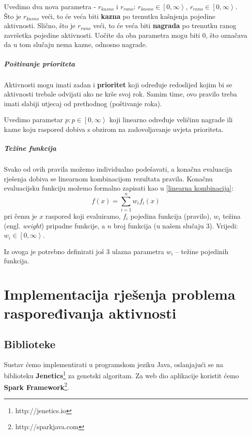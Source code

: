 \documentclass[times, utf8, zavrsni]{fer}
\begin{document}
Uvedimo dva nova parametra - $r_{kasno}$ i $r_{rano}$: $r_{kasno} \in \left[0,\infty \right>$, $r_{rano} \in \left[0,\infty \right>$. Što je $r_{kasno}$ veći, to će veća biti \textbf{kazna} po trenutku kašnjenja pojedine aktivnosti. Slično, što je $r_{rano}$ veći, to će veća biti \textbf{nagrada} po trenutku ranog završetka pojedine aktivnosti. Uočite da oba parametra mogu biti $0$, što označava da u tom slučaju nema kazne, odnosno nagrade.

\paragraph{Poštivanje prioriteta} Aktivnosti mogu imati zadan i \textbf{prioritet} koji određuje redoslijed kojim bi se aktivnosti trebale odvijati ako ne krše svoj rok. Samim time, ovo pravilo treba imati slabiji utjecaj od prethodnog (poštivanje roka).

Uvedimo parametar $p : p \in \left[0,\infty\right>$ koji linearno određuje veličinu nagrade ili kazne koju raspored dobiva s obzirom na zadovoljavanje uvjeta prioriteta.

\paragraph{Težine funkcija} Svako od ovih pravila možemo individualno podešavati, a konačna evaluacija rješenja dobiva se linearnom kombinacijom rezultata pravila. Konačnu evaluacijsku funkciju možemo formalno zapisati kao u \ref{linearna kombinacija}:
\begin{equation}\label{linearna kombinacija}
f(x) = \sum_{i=1}^{n} w_i f_i(x)
\end{equation}
pri čemu je $x$ raspored koji evaluiramo, $f_i$ pojedina funkcija (pravilo), $w_i$ težina (engl. \textit{weight}) pripadne funkcije, a $n$ broj funkcija (u našem slučaju 3). Vrijedi: $w_i \in \left[0, \infty\right>$.

Iz ovoga je potrebno definirati još 3 ulazna parametra $w_i$ -- težine pojedinih funkcija.

\chapter{Implementacija rješenja problema raspoređivanja aktivnosti}\label{implementacija}

\section{Biblioteke}
Sustav ćemo implementirati u programskom jeziku Java, oslanjajući se na biblioteku \textbf{Jenetics}\footnote{http://jenetics.io} za genetski algoritam. Za web dio aplikacije koristit ćemo \textbf{Spark Framework}\footnote{http://sparkjava.com}.
\end{document}
